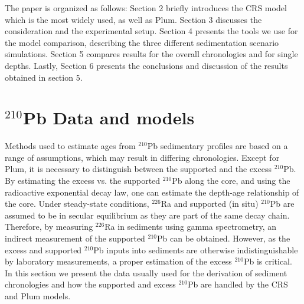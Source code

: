 \documentclass [10pt] {article}
\newcommand{\ca}{\color{black}} %
\begin{document}
	The paper is organized as follows: 
Section 2 briefly introduces the CRS model which is the most widely used, as well as Plum.
Section 3 discusses the consideration and the experimental setup.
Section 4 presents the tools we use for the model comparison, describing the three different sedimentation scenario simulations.
Section 5 compares results for the overall chronologies and for single depths.
Lastly, Section 6 presents the conclusions and discussion of the results obtained in section 5. 

\section{$^{210}$Pb Data and models}

Methods used to estimate ages from $^{210}$Pb sedimentary profiles are based on a range of assumptions, which may result in differing chronologies. Except for Plum, it is necessary to distinguish between the supported and the excess $^{210}$Pb. By estimating the excess vs. the supported $^{210}$Pb along the core, and using the radioactive exponential decay law, one can estimate the depth-age relationship of the core. Under steady-state conditions, $^{226}$Ra and supported (in situ) $^{210}$Pb are assumed to be in secular equilibrium as they are part of the same decay chain. Therefore, by measuring $^{226}$Ra in sediments using gamma spectrometry, an indirect measurement of the supported $^{210}$Pb can be obtained. However, as the excess and supported $^{210}$Pb inputs into sediments are otherwise indistinguishable by laboratory measurements, a proper estimation of the excess $^{210}$Pb is critical. In this section we present the data usually used for the derivation of sediment chronologies and how the supported and excess $^{210}$Pb are handled by the CRS and Plum models.  %

\end{document}
